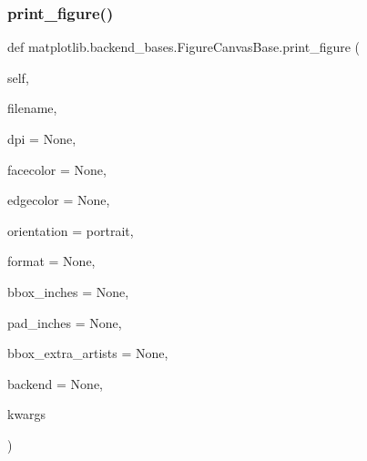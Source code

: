 \subsubsection{\texorpdfstring{print\+\_\+figure()}{print\_figure()}}
{\footnotesize\ttfamily def matplotlib.\+backend\+\_\+bases.\+Figure\+Canvas\+Base.\+print\+\_\+figure (\begin{DoxyParamCaption}\item[{}]{self,  }\item[{}]{filename,  }\item[{}]{dpi = {\ttfamily None},  }\item[{}]{facecolor = {\ttfamily None},  }\item[{}]{edgecolor = {\ttfamily None},  }\item[{}]{orientation = {\ttfamily \textquotesingle{}portrait\textquotesingle{}},  }\item[{}]{format = {\ttfamily None},  }\item[{}]{bbox\+\_\+inches = {\ttfamily None},  }\item[{}]{pad\+\_\+inches = {\ttfamily None},  }\item[{}]{bbox\+\_\+extra\+\_\+artists = {\ttfamily None},  }\item[{}]{backend = {\ttfamily None},  }\item[{}]{kwargs }\end{DoxyParamCaption})}


